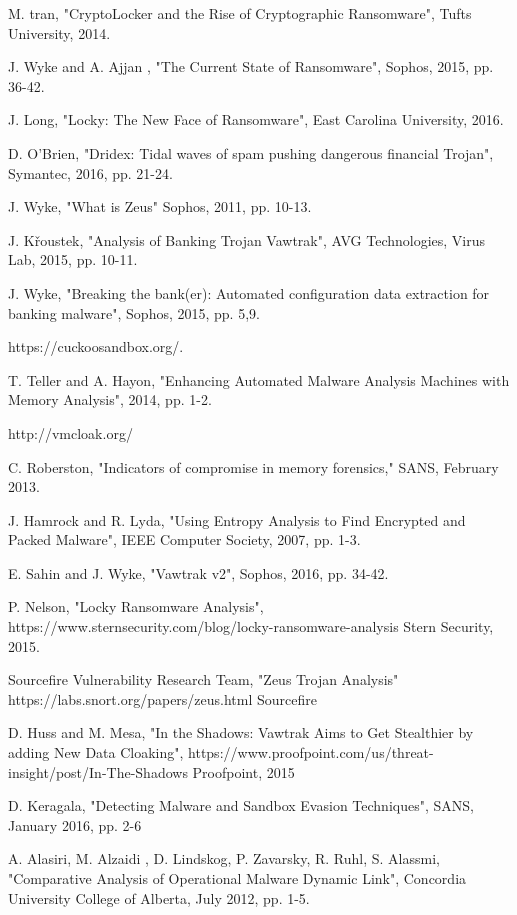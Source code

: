 \documentclass[conference]{IEEEtran}
\newcommand\blankpage{%
    \null
    \thispagestyle{plain}%
    \addtocounter{page}{0}%
    \newpage}
\begin{document}
\newpage
\afterpage{\blankpage}
\apptocmd{\thebibliography}{\setlength{\itemsep}{3pt}}{}{}
\begin{thebibliography}{}

M. tran, "CryptoLocker and the Rise of Cryptographic Ransomware",
Tufts University, 2014.

J. Wyke and A. Ajjan , "The Current State of Ransomware",
Sophos, 2015, pp. 36-42.

J. Long, "Locky: The New Face of Ransomware",
East Carolina University, 2016.

D. O'Brien, "Dridex: Tidal waves of spam pushing dangerous financial Trojan",
Symantec, 2016, pp. 21-24.

J. Wyke, "What is Zeus"
Sophos, 2011, pp. 10-13.

J. Křoustek, "Analysis of Banking Trojan Vawtrak", 
AVG Technologies, Virus Lab, 2015, pp. 10-11.

J. Wyke, "Breaking the bank(er): Automated configuration data extraction for banking malware", 
Sophos, 2015, pp. 5,9.

https://cuckoosandbox.org/.

T. Teller and A. Hayon, "Enhancing Automated Malware Analysis Machines with Memory Analysis",
2014, pp. 1-2.

http://vmcloak.org/

C. Roberston, "Indicators of compromise in memory forensics,"
SANS, February 2013. 

J. Hamrock and R. Lyda, "Using Entropy Analysis to Find Encrypted and Packed Malware", IEEE Computer Society, 2007, pp. 1-3.

E. Sahin and J. Wyke, "Vawtrak v2",
Sophos, 2016, pp. 34-42.

P. Nelson, "Locky Ransomware Analysis",
https://www.sternsecurity.com/blog/locky-ransomware-analysis
Stern Security, 2015.

Sourcefire Vulnerability Research Team, "Zeus Trojan Analysis"
https://labs.snort.org/papers/zeus.html
Sourcefire

D. Huss and M. Mesa, "In the Shadows: Vawtrak Aims to Get Stealthier by adding New Data Cloaking",
https://www.proofpoint.com/us/threat-insight/post/In-The-Shadows
Proofpoint, 2015

D.  Keragala, "Detecting Malware and Sandbox Evasion Techniques",
SANS, January 2016, pp. 2-6

A. Alasiri, M. Alzaidi , D. Lindskog, P. Zavarsky, R. Ruhl, S. Alassmi,
"Comparative Analysis of Operational Malware Dynamic Link",
Concordia University College of Alberta, July 2012,
pp. 1-5.

\end{thebibliography}
\end{document}
